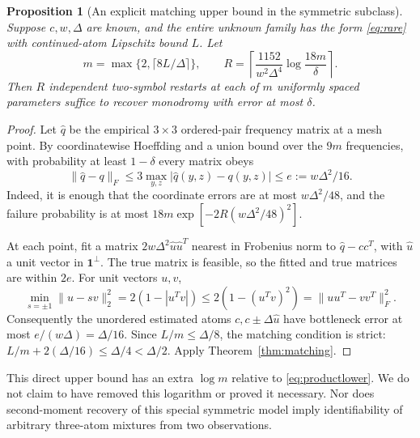 \documentclass[11pt]{article}
\newtheorem{proposition}[theorem]{Proposition}
\theoremstyle{remark}\newtheorem{remark}[theorem]{Remark}
\newcommand{\one}{\mathbf 1}
\begin{document}
\begin{proposition}[An explicit matching upper bound in the symmetric subclass]
Suppose $c,w,\Delta$ are known, and the entire unknown family has the form \eqref{eq:rare} with continued-atom Lipschitz bound $L$. Let
\[
 m=\max\{2,\lceil8L/\Delta\rceil\},\qquad
 R=\left\lceil\frac{1152}{w^2\Delta^4}\log\frac{18m}{\delta}\right\rceil.
\]
Then $R$ independent two-symbol restarts at each of $m$ uniformly spaced parameters suffice to recover monodromy with error at most $\delta$.
\end{proposition}
\begin{proof}
Let $\widehat q$ be the empirical $3\times3$ ordered-pair frequency matrix at a mesh point. By coordinatewise Hoeffding and a union bound over the $9m$ frequencies, with probability at least $1-\delta$ every matrix obeys
\[
 \|\widehat q-q\|_F\leq3\max_{y,z}|\widehat q(y,z)-q(y,z)|
 \leq e:=w\Delta^2/16.
\]
Indeed, it is enough that the coordinate errors are at most $w\Delta^2/48$, and the failure probability is at most $18m\exp[-2R(w\Delta^2/48)^2]$.

At each point, fit a matrix $2w\Delta^2\widehat u\widehat u^T$ nearest in Frobenius norm to $\widehat q-cc^T$, with $\widehat u$ a unit vector in $\one^\perp$. The true matrix is feasible, so the fitted and true matrices are within $2e$. For unit vectors $u,v$,
\[
 \min_{s=\pm1}\|u-sv\|_2^2=2(1-|u^Tv|)
 \leq2(1-(u^Tv)^2)=\|uu^T-vv^T\|_F^2.
\]
Consequently the unordered estimated atoms $c,c\pm\Delta\widehat u$ have bottleneck error at most $e/(w\Delta)=\Delta/16$. Since $L/m\leq\Delta/8$, the matching condition is strict: $L/m+2(\Delta/16)\leq\Delta/4<\Delta/2$. Apply Theorem~\ref{thm:matching}.
\end{proof}
This direct upper bound has an extra $\log m$ relative to \eqref{eq:productlower}. We do not claim to have removed this logarithm or proved it necessary. Nor does second-moment recovery of this special symmetric model imply identifiability of arbitrary three-atom mixtures from two observations.
\end{document}
